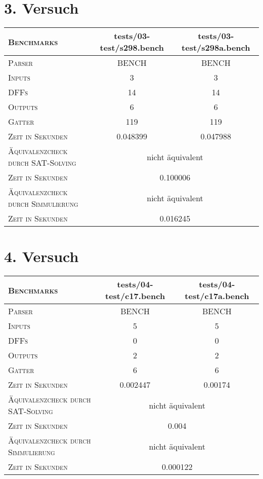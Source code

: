 \section{3. Versuch}

\begin{tabular}{|l|c|c|}
	\hline
	\textsc{Benchmarks} & tests/03-test/s298.bench & tests/03-test/s298a.bench \\
	\hline
	\hline
	\textsc{Parser} & BENCH & BENCH \\
	\hline
	\textsc{Inputs} & 3 & 3 \\
	\hline
	\textsc{DFFs} & 14 & 14 \\
	\hline
	\textsc{Outputs} & 6 & 6 \\
	\hline
	\textsc{Gatter} & 119 & 119 \\		
	\hline
	\textsc{Zeit in Sekunden} & 0.048399 &  0.047988 \\ 
	\hline
	\hline
	\textsc{Äquivalenzcheck durch SAT-Solving} & \multicolumn{2}{|c|}{nicht äquivalent} \\
	\hline
	\textsc{Zeit in Sekunden} & \multicolumn{2}{|c|}{0.100006} \\
	\hline
	\hline
	\textsc{Äquivalenzcheck durch Simmulierung} & \multicolumn{2}{|c|}{nicht äquivalent} \\
	\hline
	\textsc{Zeit in Sekunden} & \multicolumn{2}{|c|}{0.016245} \\
	\hline
\end{tabular}

\section{4. Versuch}

\begin{tabular}{|l|c|c|}
	\hline
	\textsc{Benchmarks} & tests/04-test/c17.bench & tests/04-test/c17a.bench \\
	\hline
	\hline
	\textsc{Parser} & BENCH & BENCH \\
	\hline
	\textsc{Inputs} & 5 & 5 \\
	\hline
	\textsc{DFFs} & 0 & 0 \\
	\hline
	\textsc{Outputs} & 2 & 2 \\
	\hline
	\textsc{Gatter} & 6 & 6 \\		
	\hline
	\textsc{Zeit in Sekunden} & 0.002447 & 0.00174 \\ 
	\hline
	\hline
	\textsc{Äquivalenzcheck durch SAT-Solving} & \multicolumn{2}{|c|}{nicht äquivalent} \\
	\hline
	\textsc{Zeit in Sekunden} & \multicolumn{2}{|c|}{0.004} \\
	\hline
	\hline
	\textsc{Äquivalenzcheck durch Simmulierung} & \multicolumn{2}{|c|}{nicht äquivalent} \\
	\hline
	\textsc{Zeit in Sekunden} & \multicolumn{2}{|c|}{0.000122} \\
	\hline
\end{tabular}

